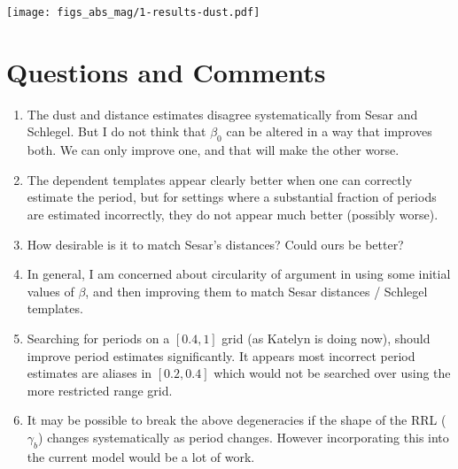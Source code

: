 \documentclass[12pt]{article}
\begin{document}
\begin{center}
  \texttt{[image: figs\_abs\_mag/1-results-dust.pdf]}
\end{center}









\section{Questions and Comments}
\label{sec:questions}

\begin{enumerate}
\item The dust and distance estimates disagree systematically from Sesar and Schlegel. But I do not think that $\beta_0$ can be altered in a way that improves both. We can only improve one, and that will make the other worse.
\item The dependent templates appear clearly better when one can correctly estimate the period, but for settings where a substantial fraction of periods are estimated incorrectly, they do not appear much better (possibly worse).
\item How desirable is it to match Sesar's distances? Could ours be better?
\item In general, I am concerned about circularity of argument in using some initial values of $\beta$, and then improving them to match Sesar distances / Schlegel templates.
\item Searching for periods on a $[0.4,1]$ grid (as Katelyn is doing now), should improve period estimates significantly. It appears most incorrect period estimates are aliases in $[0.2,0.4]$ which would not be searched over using the more restricted range grid.
\item It may be possible to break the above degeneracies if the shape of the RRL ($\gamma_b$) changes systematically as period changes. However incorporating this into the current model would be a lot of work.
\end{enumerate}



%
%
\end{document}
